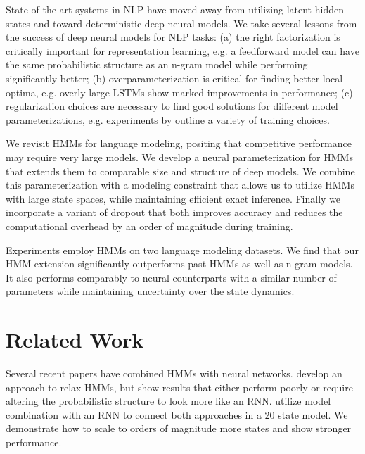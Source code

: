\documentclass[11pt,a4paper]{article}
\begin{document}
State-of-the-art systems in NLP have moved away from utilizing latent hidden states and toward deterministic deep neural models.
We take several lessons from the success of deep neural models for NLP tasks:
(a) the right factorization is critically important for representation learning, e.g. a feedforward model \cite{bengio2003nlm}
can have the same probabilistic structure as an n-gram model while performing significantly better;
(b) overparameterization is critical for finding better local optima,
e.g. overly large LSTMs \cite{zaremba2014lstm} show marked improvements in performance;
(c) regularization choices are necessary to find good solutions for different model parameterizations,
e.g. experiments by \citet{merity2017awdlstm} outline a variety of training choices.

We revisit HMMs for language modeling, positing that competitive performance may require very large models. 
We develop a neural parameterization for HMMs that extends 
them to comparable size and structure of deep models.
We combine this parameterization with a modeling constraint that allows us to utilize HMMs with large state spaces, while maintaining efficient exact inference.
Finally we incorporate a variant of dropout that both improves accuracy
and reduces the computational overhead by an order of magnitude during training. 

Experiments employ HMMs on two language modeling datasets. We find that our HMM extension significantly outperforms past HMMs as well as n-gram models. 
It also performs comparably to neural counterparts with a similar number of parameters
while maintaining uncertainty over the state dynamics.

\section{Related Work}

Several recent papers have combined HMMs with 
neural networks. \citet{buys2018hmm}
develop an approach to relax HMMs, but show results that either perform poorly or require altering the probabilistic structure to look more like an RNN.  \citet{krakovna2016hmm} utilize model combination with an RNN to connect both approaches in a 20 state model. We demonstrate how to scale to orders of magnitude more states and show stronger performance.
\end{document}
